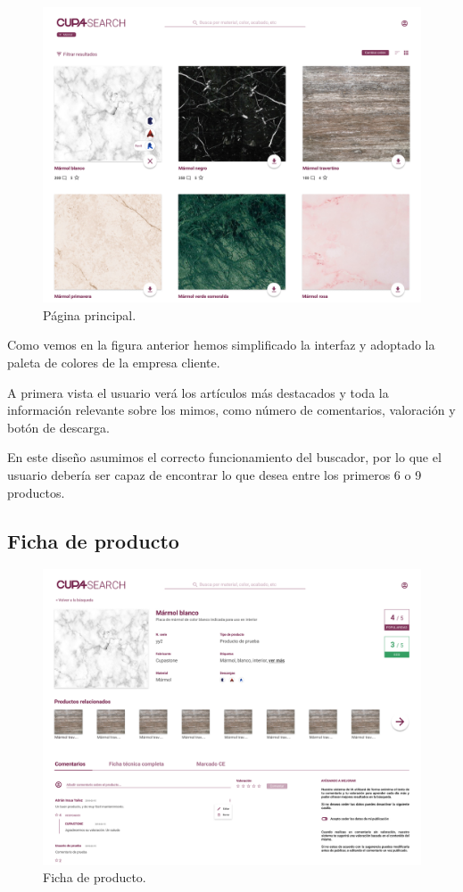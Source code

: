 \begin{figure}[H]
	\centering
	\includegraphics[width=1\textwidth]{imaxes/redHome.png}
	\caption{Página principal.}
	\label{redhome}
\end{figure}

Como vemos en la figura anterior hemos simplificado la interfaz y adoptado la paleta de colores de la empresa cliente.

A primera vista el usuario verá los artículos más destacados y toda la información relevante sobre los mimos, como número de comentarios, valoración y botón de descarga.

En este diseño asumimos el correcto funcionamiento del buscador, por lo que el usuario debería ser capaz de encontrar lo que desea entre los primeros 6 o 9 productos.

\subsection{Ficha de producto}

\begin{figure}[H]
	\centering
	\includegraphics[width=1\textwidth]{imaxes/redProdDet.png}
	\caption{Ficha de producto.}
	\label{redProd}
\end{figure}

